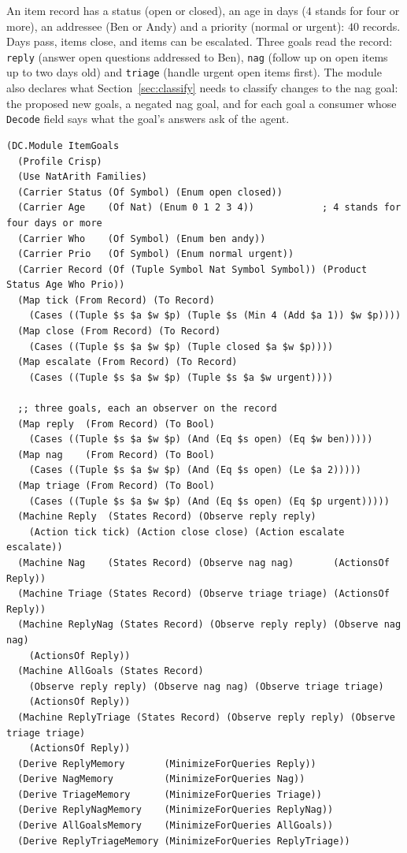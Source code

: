 \documentclass[11pt]{article}
\newcommand{\code}[1]{\texttt{#1}}
\theoremstyle{definition}
\theoremstyle{plain}
\begin{document}
An item record has a status (open or closed), an age in days ($4$ stands for four or more), an
addressee (Ben or Andy) and a priority (normal or urgent): $40$ records. Days pass, items close, and
items can be escalated. Three goals read the record: \code{reply} (answer open questions addressed
to Ben), \code{nag} (follow up on open items up to two days old) and \code{triage} (handle urgent
open items first). The module also declares what Section~\ref{sec:classify} needs to classify
changes to the nag goal: the proposed new goals, a negated nag goal, and for each goal a consumer
whose \code{Decode} field says what the goal's answers ask of the agent.
\begin{lstlisting}[style=mettamod]
(DC.Module ItemGoals
  (Profile Crisp)
  (Use NatArith Families)
  (Carrier Status (Of Symbol) (Enum open closed))
  (Carrier Age    (Of Nat) (Enum 0 1 2 3 4))            ; 4 stands for four days or more
  (Carrier Who    (Of Symbol) (Enum ben andy))
  (Carrier Prio   (Of Symbol) (Enum normal urgent))
  (Carrier Record (Of (Tuple Symbol Nat Symbol Symbol)) (Product Status Age Who Prio))
  (Map tick (From Record) (To Record)
    (Cases ((Tuple $s $a $w $p) (Tuple $s (Min 4 (Add $a 1)) $w $p))))
  (Map close (From Record) (To Record)
    (Cases ((Tuple $s $a $w $p) (Tuple closed $a $w $p))))
  (Map escalate (From Record) (To Record)
    (Cases ((Tuple $s $a $w $p) (Tuple $s $a $w urgent))))

  ;; three goals, each an observer on the record
  (Map reply  (From Record) (To Bool)
    (Cases ((Tuple $s $a $w $p) (And (Eq $s open) (Eq $w ben)))))
  (Map nag    (From Record) (To Bool)
    (Cases ((Tuple $s $a $w $p) (And (Eq $s open) (Le $a 2)))))
  (Map triage (From Record) (To Bool)
    (Cases ((Tuple $s $a $w $p) (And (Eq $s open) (Eq $p urgent)))))
  (Machine Reply  (States Record) (Observe reply reply)
    (Action tick tick) (Action close close) (Action escalate escalate))
  (Machine Nag    (States Record) (Observe nag nag)       (ActionsOf Reply))
  (Machine Triage (States Record) (Observe triage triage) (ActionsOf Reply))
  (Machine ReplyNag (States Record) (Observe reply reply) (Observe nag nag)
    (ActionsOf Reply))
  (Machine AllGoals (States Record)
    (Observe reply reply) (Observe nag nag) (Observe triage triage)
    (ActionsOf Reply))
  (Machine ReplyTriage (States Record) (Observe reply reply) (Observe triage triage)
    (ActionsOf Reply))
  (Derive ReplyMemory       (MinimizeForQueries Reply))
  (Derive NagMemory         (MinimizeForQueries Nag))
  (Derive TriageMemory      (MinimizeForQueries Triage))
  (Derive ReplyNagMemory    (MinimizeForQueries ReplyNag))
  (Derive AllGoalsMemory    (MinimizeForQueries AllGoals))
  (Derive ReplyTriageMemory (MinimizeForQueries ReplyTriage))


\end{lstlisting}
\end{document}
